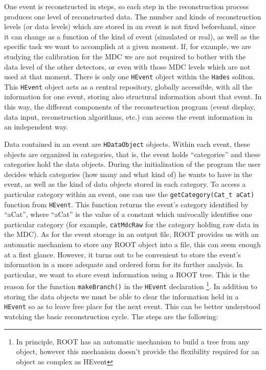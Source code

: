 One event is reconstructed in steps, so each step in the reconstruction 
process produces one level of reconstructed data. The number and kinds 
of reconstruction levels (or data levels) which are stored in an event 
is not fixed beforehand, since it can change as a function of the kind 
of event (simulated or real), as well as the specific task we want to 
accomplish at a given moment. If, for example, we are studying the 
calibration for the MDC we are not required to bother with the data 
level of the other detectors, or even with those MDC levels which are 
not used at that moment.
There is only one \verb+HEvent+ object within the \verb+Hades+ soliton. 
This \verb+HEvent+ object acts as a central repository, globally 
accessible, with all the information for one event, storing also 
structural information about that event. In this way, the different 
components of the reconstruction program (event display, data input, 
reconstruction algorithms, etc.) can access the event information in 
an independent way.

Data contained in an event are \verb+HDataObject+ objects. Within each 
event, these objects are organized in categories, that is, the event 
holds ``categories'' and these categories hold the data objects. 
During the initialization of the program the user decides which 
categories (how many and what kind of) he wants to have in the event, 
as well as the kind of data objects stored in each category.
To access a particular category within an event, one can use the 
\verb+getCategory(Cat_t aCat)+ function from \verb+HEvent+. This 
function returns the event's category identified by ``aCat'', 
where ``aCat'' is the value of a constant which univocally identifies 
one particular category (for example, \verb+catMdcRaw+ for the 
category holding raw data in the MDC).
As for the event storage in an output file, ROOT provides us with 
an automatic mechanism to store any ROOT object into a file, this 
can seem enough at a first glance. However, it turns out to be 
convenient to store the event's information in a more adequate and 
ordered form for its further analysis. In particular, we want to 
store event information using a ROOT tree. This is the reason for 
the function \verb+makeBranch()+ in the \verb+HEvent+ 
declaration \footnote{ In principle, ROOT has an automatic mechanism 
to build a tree from any object, however this mechanism doesn't provide 
the flexibility required for an object as complex as HEvent}.
In addition to storing the data objects we must be able to clear the 
information held in a \verb+HEvent+ so as to leave free place for 
the next event. This can be better understood watching the basic 
reconstruction cycle. The steps are the following:

